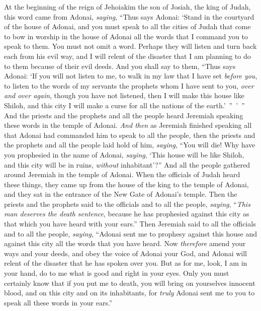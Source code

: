 \begin{biblechapter} %
 At the beginning of the reign of Jehoiakim the son of Josiah, the king of Judah, this word came from Adonai, \textit{saying},
\verse “Thus says Adonai: ‘Stand in the courtyard of the house of Adonai, and you must speak to all the cities of Judah that come to bow in worship in the house of Adonai all the words that I command you to speak to them. You must not omit a word.
\verse Perhaps they will listen and turn back each from his evil way, and I will relent of the disaster that I am planning to do to them because of their evil deeds.
\verse And you shall say to them, “Thus says Adonai: ‘If you will not listen to me, to walk in my law that I have set \textit{before you},
\verse to listen to the words of my servants the prophets whom I have sent to you, \textit{over and over again}, though you have not listened,
\verse then I will make this house like Shiloh, and this city I will make a curse for all the nations of the earth.’ ” ’ ”
\verse And the priests and the prophets and all the people heard Jeremiah speaking these words in the temple of Adonai.
\verse \textit{And then} as Jeremiah finished speaking all that Adonai had commanded him to speak to all the people, then the priests and the prophets and all the people laid hold of him, \textit{saying}, “You will die!
\verse Why have you prophesied in the name of Adonai, \textit{saying}, ‘This house will be like Shiloh, and this city will be in ruins, \textit{without} inhabitant’?” And all the people gathered around Jeremiah in the temple of Adonai.
\verse When the officials of Judah heard these things, they came up from the house of the king to the temple of Adonai, and they sat in the entrance of the New Gate of Adonai’s temple.
\verse Then the priests and the prophets said to the officials and to all the people, \textit{saying}, “\textit{This man deserves the death sentence}, because he has prophesied against this city as that which you have heard with your ears.”
\verse Then Jeremiah said to all the officials and to all the people, \textit{saying}, “Adonai sent me to prophesy against this house and against this city all the words that you have heard.
\verse Now \textit{therefore} amend your ways and your deeds, and obey the voice of Adonai your God, and Adonai will relent of the disaster that he has spoken over you.
\verse But as for me, look, I am in your hand, do to me what is good and right in your eyes.
\verse Only you must certainly know that if you put me to death, you will bring on yourselves innocent blood, and on this city and on its inhabitants, for \textit{truly} Adonai sent me to you to speak all these words in your ears.”

\end{biblechapter}
